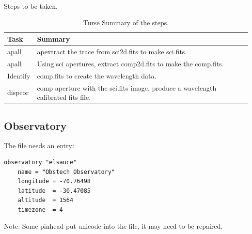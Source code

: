 \begin{table}[h!]
\centering

Steps to be taken.

\begin{tabular}{| l | l |}
\hline
Task     & Summary    \\ 
\hline
apall    & apextract the trace from sci2d.fits to make sci.fits.    \\ 
apall    & Using sci apertures, extract comp2d.fits to make the comp.fits.    \\ 
Identify & comp.fits to create the wavelength data.    \\ 
dispcor  & comp aperture with the sci.fits image, produce a wavelength calibrated fits file.    \\ 

\hline
\end{tabular}
\caption[TOC]{Turse Summary of the steps.}
\label{table:TurseSummaryofthesteps.}
\end{table}

\subsection{Observatory}

The file  needs an entry:
\begingroup \fontsize{10pt}{10pt}
\selectfont
\begin{verbatim} 
observatory "elsauce"
    name = "Obstech Observatory"
    longitude = -70.76498
    latitude  = -30.47085
    altitude  = 1564
    timezone  = 4
\end{verbatim}
\endgroup

Note: Some pinhead put unicode into the file, it may need to be repaired.
